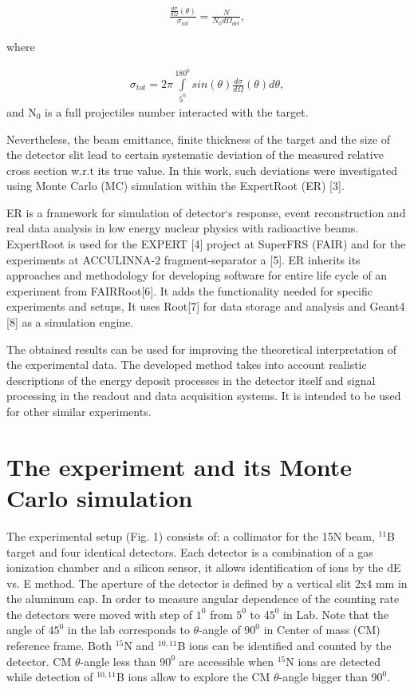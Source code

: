 \documentclass[%
 aip,
cp,  %
 amsmath,amssymb,%
 reprint,%
]{revtex4-2}
\begin{document}
\begin{eqnarray}
 \frac{ \frac{d\sigma}{d\Omega}(\theta) }{\sigma_{tot}} = \frac{N}{N_0 d\Omega_{det}},
\end{eqnarray}

where

\begin{eqnarray}
  \sigma_{tot} = 2\pi \int\limits_{5^{0}}^{180^{0}} sin(\theta)\frac{d\sigma}{d\Omega}(\theta)d\theta,
 \end{eqnarray}
and N$_{0}$ is a full projectiles number interacted with the target.

Nevertheless, the beam emittance, finite thickness of the target and the size of the detector slit lead to certain systematic deviation of the measured relative cross section w.r.t its true value. In this work, such deviations were investigated using Monte Carlo (MC) simulation within the ExpertRoot (ER) [3].

ER is a framework for simulation of detector`s response, event reconstruction and real data analysis in low energy nuclear physics with radioactive beams. ExpertRoot is used for the EXPERT [4] project at SuperFRS (FAIR) and for the experiments at ACCULINNA-2 fragment-separator a [5].  ER inherits its approaches and methodology for developing software for entire life cycle of an experiment from FAIRRoot[6]. It adds the functionality needed for specific experiments and setups, It uses Root[7] for data storage and analysis and Geant4 [8] as a simulation engine.

The obtained results can be used for improving the theoretical interpretation of the experimental data. The developed method takes into account realistic descriptions of the energy deposit processes in the detector itself and signal processing in the readout and data acquisition systems. It is intended to be used for other similar experiments.

\section{The experiment and its Monte Carlo simulation}

The experimental setup (Fig. 1) consists of: a collimator for the 15N beam, ${}^{11}$B target and four identical detectors. Each detector is a combination of a gas ionization chamber and a silicon sensor, it allows identification of ions by the dE vs. E method. The aperture of the detector is defined by a vertical slit 2x4 mm in the aluminum cap. In order to measure angular dependence of the counting rate the detectors were moved with step of $1^0$  from $5^0$ to 4$5^0$ in Lab. Note that the angle of 4$5^0$ in the lab corresponds to $\theta$-angle of 9$0^0$  in Center of mass (CM) reference frame. Both ${}^{15}$N and ${}^{10,11}$B ions can be identified and counted by the detector. CM $\theta$-angle less than 9$0^0$  are accessible when ${}^{15}$N ions are detected while detection of ${}^{10,11}$B ions allow to explore the CM $\theta$-angle bigger than 9$0^0$.
\end{document}
